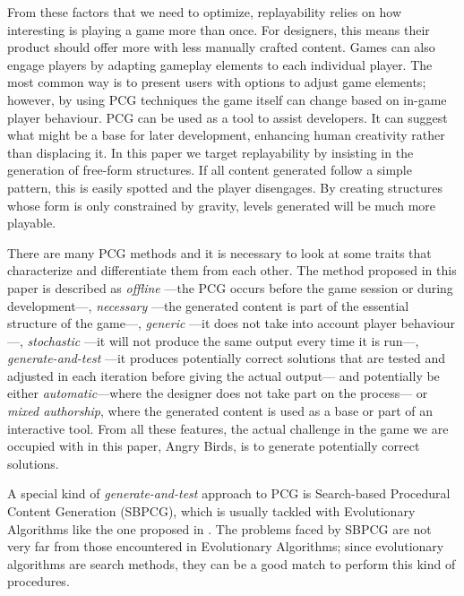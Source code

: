 \documentclass[sigconf]{acmart}
\begin{document}
From these factors that we need to optimize, replayability relies on how interesting is 
playing a game more than once. For designers, this means their 
product should offer more with less manually crafted content. 
Games can also engage players by adapting gameplay elements to each individual 
player. The most common way is 
to present users with options to adjust game elements; however, by using PCG techniques 
the game itself can change based on in-game player behaviour.
PCG can be used as a tool to assist developers. It can suggest what might be a 
base for later development, enhancing human creativity rather than displacing 
it. In this paper we target replayability by insisting in the
generation of free-form structures. If all content generated follow a
simple pattern, this is easily spotted and the player disengages. By
creating structures whose form is only constrained by gravity, levels
generated will be much more playable.

There are many PCG methods and it is necessary to look at some traits that 
characterize and differentiate them from each 
other\cite{togelius2016introduction}. The method proposed in this paper is 
described as \textit{offline} ---the PCG occurs before the game session or 
during development---, \textit{necessary} ---the generated content is part of 
the essential structure of the game---, \textit{generic} ---it does not take 
into account player behaviour---, \textit{stochastic} ---it will not produce 
the same output every time it is run---, \textit{generate-and-test} ---it 
produces potentially correct solutions that are tested and adjusted in each 
iteration before giving the actual output--- and potentially be either 
\textit{automatic}---where the designer does not take part on the process--- or 
\textit{mixed authorship}, where the generated content is used as a base or 
part of an interactive tool. From all these features, the actual
challenge in the game we are occupied with in this paper, Angry Birds,
is to generate potentially correct solutions.

A special kind of \textit{generate-and-test} approach to PCG is
Search-based Procedural Content Generation (SBPCG), which is
usually tackled with Evolutionary Algorithms\cite{togelius2010search} like the 
one proposed in \cite{hastings2009evolving}. 
The problems faced by SBPCG are not very far from those encountered in
Evolutionary Algorithms; since evolutionary algorithms are search
methods, they can be a good match to perform this kind of procedures. 
\end{document}
